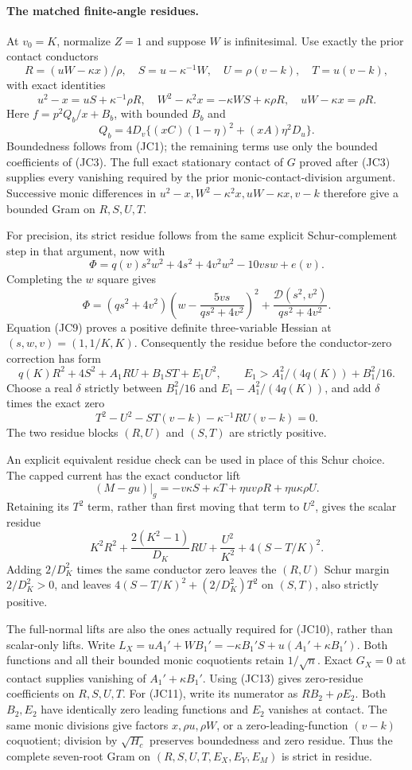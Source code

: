 \paragraph{The matched finite-angle residues.}
At $v_0=K$, normalize $Z=1$ and suppose $W$ is infinitesimal.
Use exactly the prior contact conductors
\[
 R=(uW-\kappa x)/\rho,\quad S=u-\kappa^{-1}W,
 \quad U=\rho(v-k),\quad T=u(v-k),
\]
with exact identities
\[
 u^2-x=uS+\kappa^{-1}\rho R,\quad
 W^2-\kappa^2x=-\kappa WS+\kappa\rho R,
 \quad uW-\kappa x=\rho R.                           \tag{JC13}
\]
Here $f=p^2Q_b/x+B_b$, with bounded $B_b$ and
\[
 Q_b=4D_v\{(xC)(1-\eta)^2+(xA)\eta^2D_u\}.
\]
Boundedness follows from (JC1); the remaining terms use only
the bounded coefficients of (JC3).  The full exact stationary
contact of $G$ proved after (JC3) supplies every vanishing required
by the prior monic-contact-division argument.  Successive monic
differences in $u^2-x,W^2-\kappa^2x,uW-\kappa x,v-k$ therefore
give a bounded Gram on $R,S,U,T$.

For precision, its strict residue follows from the same explicit
Schur-complement step in that argument, now with
\[
 \Phi=q(v)s^2w^2+4s^2+4v^2w^2-10vsw+e(v).
\]
Completing the $w$ square gives
\[
 \Phi=(qs^2+4v^2)
       \left(w-\frac{5vs}{qs^2+4v^2}\right)^2
       +\frac{\mathcal D(s^2,v^2)}{qs^2+4v^2}.
\]
Equation (JC9) proves a positive definite three-variable Hessian
at $(s,w,v)=(1,1/K,K)$.  Consequently the residue before the
conductor-zero correction has form
\[
 q(K)R^2+4S^2+A_1RU+B_1ST+E_1U^2,
 \qquad E_1>A_1^2/(4q(K))+B_1^2/16.
\]
Choose a real $\delta$ strictly between $B_1^2/16$ and
$E_1-A_1^2/(4q(K))$, and add $\delta$ times the exact zero
\[
 T^2-U^2-ST(v-k)-\kappa^{-1}RU(v-k)=0.
\]
The two residue blocks $(R,U)$ and $(S,T)$ are strictly positive.

An explicit equivalent residue check can be used in place of this
Schur choice.  The capped current has the exact conductor lift
\[
 (M-gu)|_g=-v\kappa S+\kappa T
                  +\eta uv\rho R+\eta u\kappa\rho U.
\]
Retaining its $T^2$ term, rather than first moving that term to $U^2$,
gives the scalar residue
\[
 K^2R^2+\frac{2(K^2-1)}{D_K}RU+\frac{U^2}{K^2}
                  +4(S-T/K)^2.
\]
Adding $2/D_K^2$ times the same conductor zero leaves the $(R,U)$
Schur margin $2/D_K^2>0$, and leaves
$4(S-T/K)^2+(2/D_K^2)T^2$ on $(S,T)$, also strictly positive.

The full-normal lifts are also the ones actually required for
(JC10), rather than scalar-only lifts.  Write
$L_X=uA_1'+WB_1'=-\kappa B_1'S+u(A_1'+\kappa B_1')$.
Both functions and all their bounded monic coquotients retain
$1/\sqrt n$.  Exact $G_X=0$ at contact supplies vanishing of
$A_1'+\kappa B_1'$.  Using (JC13) gives zero-residue coefficients
on $R,S,U,T$.  For (JC11), write its numerator as $RB_2+\rho E_2$.
Both $B_2,E_2$ have identically zero leading functions and $E_2$
vanishes at contact.  The same monic divisions give factors
$x,\rho u,\rho W$, or a zero-leading-function $(v-k)$ coquotient;
division by $\sqrt{H_c}$ preserves boundedness and zero residue.
Thus the complete seven-root Gram on
$(R,S,U,T,E_X,E_Y,E_M)$ is strict in residue.


